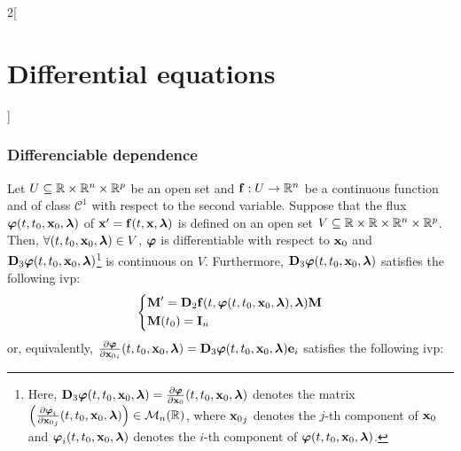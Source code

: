\documentclass[../../../main.tex]{subfiles}
\begin{document}
\begin{multicols}{2}[\section{Differential equations}]
  \subsubsection{Differenciable dependence}
  \begin{theorem}
    Let $U\subseteq\mathbb{R}\times\mathbb{R}^n\times\mathbb{R}^p$ be an open set and $\boldsymbol{\mathrm{f}}:U\rightarrow\mathbb{R}^n$ be a continuous function and of class $\mathcal{C}^1$ with respect to the second variable. Suppose that the flux $\boldsymbol{\mathrm{\varphi}}(t,t_0,\boldsymbol{\mathrm{x}}_0,\boldsymbol{\mathrm{\lambda}})$ of $\boldsymbol{\mathrm{x}}'=\boldsymbol{\mathrm{f}}(t,\boldsymbol{\mathrm{x}},\boldsymbol{\mathrm{\lambda}})$ is defined on an open set $V\subseteq\mathbb{R}\times\mathbb{R}\times\mathbb{R}^n\times\mathbb{R}^p$. Then, $\forall (t,t_0,\boldsymbol{\mathrm{x}}_0,\boldsymbol{\mathrm{\lambda}})\in V$, $\boldsymbol{\mathrm{\varphi}}$ is differentiable with respect to $\boldsymbol{\mathrm{x}}_0$ and $\boldsymbol{\mathrm{D}}_3\boldsymbol{\mathrm{\varphi}}(t,t_0,\boldsymbol{\mathrm{x}}_0,\boldsymbol{\mathrm{\lambda}})$\footnote{Here, $\boldsymbol{\mathrm{D}}_3\boldsymbol{\mathrm{\varphi}}(t,t_0,\boldsymbol{\mathrm{x}}_0,\boldsymbol{\mathrm{\lambda}})=\frac{\partial\boldsymbol{\mathrm{\varphi}}}{\partial \boldsymbol{\mathrm{x}}_0}(t,t_0,\boldsymbol{\mathrm{x}}_0,\boldsymbol{\mathrm{\lambda}})$ denotes the matrix $\left(\frac{\partial\boldsymbol{\mathrm{\varphi}}_i}{\partial{\boldsymbol{\mathrm{x}}_0}_j}(t,t_0,\boldsymbol{\mathrm{x}}_0,\boldsymbol{\mathrm{\lambda}})\right)\in\mathcal{M}_n(\mathbb{R})$, where ${\boldsymbol{\mathrm{x}}_0}_j$ denotes the $j$-th component of $\boldsymbol{\mathrm{x}}_0$ and $\boldsymbol{\mathrm{\varphi}}_i(t,t_0,\boldsymbol{\mathrm{x}}_0,\boldsymbol{\mathrm{\lambda}})$ denotes the $i$-th component of $\boldsymbol{\mathrm{\varphi}}(t,t_0,\boldsymbol{\mathrm{x}}_0,\boldsymbol{\mathrm{\lambda}})$.} is continuous on $V$. Furthermore, $\boldsymbol{\mathrm{D}}_3\boldsymbol{\mathrm{\varphi}}(t,t_0,\boldsymbol{\mathrm{x}}_0,\boldsymbol{\mathrm{\lambda}})$ satisfies the following ivp:
    \begin{equation*}
      \left\{
      \begin{aligned}
         & \boldsymbol{\mathrm{M}}'      =\boldsymbol{\mathrm{D}}_2\boldsymbol{\mathrm{f}}(t,\boldsymbol{\mathrm{\varphi}}(t,t_0,\boldsymbol{\mathrm{x}}_0,\boldsymbol{\mathrm{\lambda}}),\boldsymbol{\mathrm{\lambda}})\boldsymbol{\mathrm{M}} \\
         & \boldsymbol{\mathrm{M}}(t_0)  =\boldsymbol{\mathrm{I}}_n
      \end{aligned}
      \right.
    \end{equation*}
    or, equivalently, $\frac{\partial\boldsymbol{\mathrm{\varphi}}}{\partial {\boldsymbol{\mathrm{x}}_0}_i}(t,t_0,\boldsymbol{\mathrm{x}}_0,\boldsymbol{\mathrm{\lambda}})=\boldsymbol{\mathrm{D}}_3\boldsymbol{\mathrm{\varphi}}(t,t_0,\boldsymbol{\mathrm{x}}_0,\boldsymbol{\mathrm{\lambda}})\boldsymbol{\mathrm{e}}_i$ satisfies the following ivp:

\end{theorem}
\end{multicols}
\end{document}

